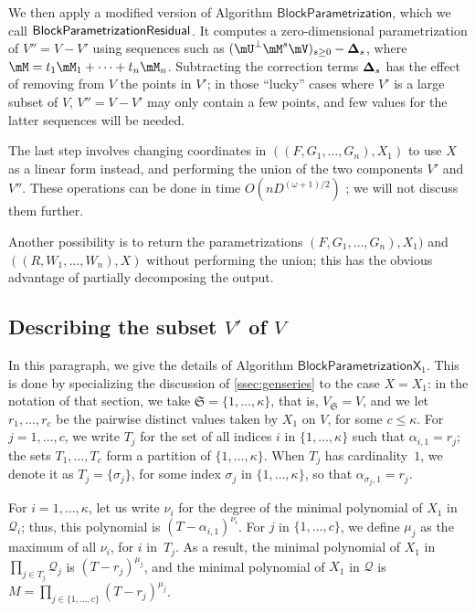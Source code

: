 \documentclass[12pt]{article}
\newcommand{\mat}[1]{\bm{\MakeUppercase{#1}}} %
\newcommand{\mainalgoname}{\mathsf{ BlockParametrization}}
\newcommand{\lf}{X}
\newcommand{\residueI}{\mathscr{Q}}
\def\dg{\kappa}
\begin{document}
We then apply a modified version of Algorithm $\mainalgoname$, which we call
$\mainalgoname{\sf Residual}$. It computes a zero-dimensional
parametrization of $V''=V-V'$ using sequences such as $(\mU^\perp
\mM^s \mV)_{s \ge 0} - \mat{\Delta}_s$, where $\mM= t_1 \mM_1 + \cdots
+ t_n \mM_n$. Subtracting the correction terms $\mat{\Delta}_s$ has
the effect of removing from $V$ the points in $V'$; in those ``lucky''
cases where $V'$ is a large subset of $V$, $V''=V-V'$ may only contain
a few points, and few values for the latter sequences will be needed.

The last step involves changing coordinates in $((F,G_1,\dots,G_n),X_1)$ to use
$\lf$ as a linear form instead, and performing the union of the two components
$V'$ and $V''$. These operations can be done in time $O(n D^{(\omega+1)/2})$
\cite[Lemmas~2 \&~3]{PoSc13b}; we will not discuss them further.

\begin{remark}
  Another possibility is to return the parametrizations
  $(F,G_1,\dots,G_n),X_1)$ and $((R,W_1,\dots,W_n),\lf)$ without
  performing the union; this has the obvious advantage of partially
  decomposing the output.
\end{remark}


\subsection{Describing the subset \texorpdfstring{$V'$}{V'} of \texorpdfstring{$V$}{V}}

In this paragraph, we give the details of Algorithm
$\mathsf{BlockParametrizationX}_1$. This is done by specializing the
discussion of \cref{ssec:genseries} to the case $\lf=X_1$:
in the notation of that section, we take
$\mathfrak{S}=\{1,\dots,\dg\}$, that is, $V_{\mathfrak{S}}=V$, and we
let $r_1,\dots,r_c$ be the pairwise distinct values taken by $X_1$ on
$V$, for some $c \le \dg$.  For $j=1,\dots,c$, we write $T_j$ for the
set of all indices $i$ in $\{1,\dots,\dg\}$ such that
$\alpha_{i,1}=r_j$; the sets $T_1,\dots,T_c$ form a partition of
$\{1,\dots,\dg\}$. When $T_j$ has cardinality~$1$, we denote it as
$T_j=\{\sigma_j\}$, for some index $\sigma_j$ in $\{1,\dots,\dg\}$, so
that $\alpha_{\sigma_j,1}=r_j$.

For $i=1,\dots,\dg$, let us write $\nu_i$ for the degree of the minimal
polynomial of $X_1$ in $\residueI_i$; thus, this polynomial is
$(T-\alpha_{i,1})^{\nu_i}$. For $j$ in $\{1,\dots,c\}$, we define
$\mu_j$ as the maximum of all $\nu_i$, for $i$ in~$T_j$. As a result, the minimal
polynomial of $X_1$ in $\prod_{j \in T_j} \residueI_j$ is 
$(T-r_j)^{\mu_j}$, and the minimal polynomial of $X_1$ in $\residueI$ is
$M=\prod_{j \in \{1,\dots,c\}} (T-r_j)^{\mu_j}$.
\end{document}
